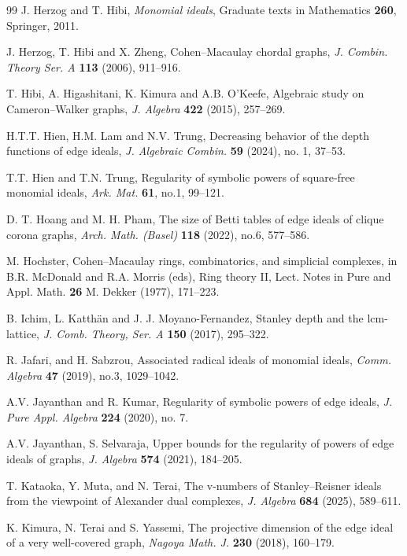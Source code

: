\documentclass[12pt]{amsart}
\theoremstyle{definition}
\theoremstyle{remark}
\begin{document}
\begin{thebibliography}{99}
 J. Herzog and T. Hibi, 
\emph{Monomial ideals}, 
Graduate texts in Mathematics {\bf 260}, Springer, 2011.

 J. Herzog, T. Hibi and X. Zheng, 
Cohen--Macaulay chordal graphs, 
\textit{J. Combin. Theory Ser. A} \textbf{113} (2006), 911--916.

 T. Hibi, A. Higashitani, K. Kimura and A.B. O'Keefe, 
Algebraic study on Cameron--Walker graphs, 
\textit{J. Algebra} \textbf{422} (2015), 257--269.

 H.T.T. Hien, H.M. Lam and N.V. Trung, 
Decreasing behavior of the depth functions of edge ideals, 
{\it J. Algebraic Combin.} {\bf 59} (2024), no. 1, 37--53. 

 T.T. Hien and T.N. Trung, 
Regularity of symbolic powers of square-free monomial ideals, 
{\it Ark. Mat.} {\bf 61}, no.1, 99--121.

 D. T. Hoang and M. H. Pham, 
The size of Betti tables of edge ideals of clique corona graphs, 
\textit{Arch. Math. (Basel)} \textbf{118} (2022), no.6, 577--586.

 M. Hochster, 
Cohen--Macaulay rings, combinatorics, and simplicial complexes, 
in B.R. McDonald and R.A. Morris (eds), Ring theory II, Lect. Notes in Pure and Appl. Math. {\bf 26} M. Dekker (1977), 171--223. 

 B. Ichim, L. Katth{\"a}n and J. J. Moyano-Fernandez, Stanley depth and the lcm-lattice, 
{\it J. Comb. Theory, Ser. A} {\bf 150} (2017), 295--322.

 R. Jafari, and H. Sabzrou, 
Associated radical ideals of monomial ideals, 
{\it Comm. Algebra} {\bf 47} (2019), no.3, 1029--1042. 

 A.V. Jayanthan and R. Kumar,
Regularity of symbolic powers of edge ideals, 
{\it J. Pure Appl. Algebra} {\bf 224} (2020), no. 7. 

 A.V. Jayanthan, S. Selvaraja, 
Upper bounds for the regularity of powers of edge ideals of
graphs, 
{\it J. Algebra} {\bf 574} (2021), 184--205.

 T. Kataoka, Y. Muta, and N. Terai,
The {\rm v}-numbers of Stanley--Reisner ideals from the viewpoint of Alexander dual complexes, 
{\it J. Algebra} {\bf 684} (2025), 589--611.

 K. Kimura, N. Terai and S. Yassemi, 
The projective dimension of the edge ideal of a very well-covered graph, 
\textit{Nagoya Math. J.} \textbf{230} (2018), 160--179.



\end{thebibliography}
\end{document}
